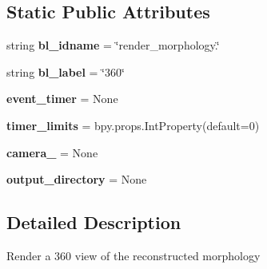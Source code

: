 \subsection*{Static Public Attributes}
\begin{DoxyCompactItemize}
\item 
string {\bfseries bl\+\_\+idname} = \char`\"{}render\+\_\+morphology.\char`\"{}\hypertarget{classui__morphology__panel_1_1RenderMorphology360_a3294dfd40ca7ad0ef15d6950e80bb1be}{}\label{classui__morphology__panel_1_1RenderMorphology360_a3294dfd40ca7ad0ef15d6950e80bb1be}

\item 
string {\bfseries bl\+\_\+label} = \char`\"{}360\char`\"{}\hypertarget{classui__morphology__panel_1_1RenderMorphology360_a88ae26f61e45b0d7d26252b4dbb2803a}{}\label{classui__morphology__panel_1_1RenderMorphology360_a88ae26f61e45b0d7d26252b4dbb2803a}

\item 
{\bfseries event\+\_\+timer} = None\hypertarget{classui__morphology__panel_1_1RenderMorphology360_a97278d33535041b4d55c818127ce76a1}{}\label{classui__morphology__panel_1_1RenderMorphology360_a97278d33535041b4d55c818127ce76a1}

\item 
{\bfseries timer\+\_\+limits} = bpy.\+props.\+Int\+Property(default=0)\hypertarget{classui__morphology__panel_1_1RenderMorphology360_a13026e4296c450197048fae125f38cae}{}\label{classui__morphology__panel_1_1RenderMorphology360_a13026e4296c450197048fae125f38cae}

\item 
{\bfseries camera\+\_} = None\hypertarget{classui__morphology__panel_1_1RenderMorphology360_a6279b3c7f0c5254975d588c1c4a291ec}{}\label{classui__morphology__panel_1_1RenderMorphology360_a6279b3c7f0c5254975d588c1c4a291ec}

\item 
{\bfseries output\+\_\+directory} = None\hypertarget{classui__morphology__panel_1_1RenderMorphology360_aefccc6126d39f5d30ef317061b7d760f}{}\label{classui__morphology__panel_1_1RenderMorphology360_aefccc6126d39f5d30ef317061b7d760f}

\end{DoxyCompactItemize}


\subsection{Detailed Description}
\begin{DoxyVerb}Render a 360 view of the reconstructed morphology\end{DoxyVerb}
 

